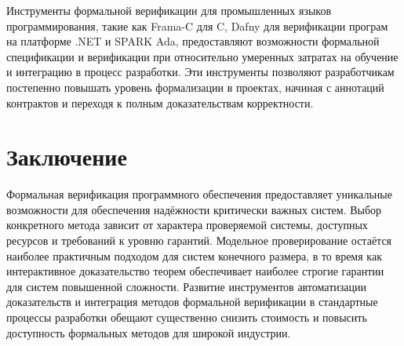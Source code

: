 \documentclass[
    language=russian,
    doctype=article,
]{../../omnilatex}
\begin{document}
Инструменты формальной верификации для промышленных языков программирования, такие как Frama-C для C, Dafny для верификации програм на платформе .NET и SPARK Ada, предоставляют возможности формальной спецификации и верификации при относительно умеренных затратах на обучение и интеграцию в процесс разработки. Эти инструменты позволяют разработчикам постепенно повышать уровень формализации в проектах, начиная с аннотаций контрактов и переходя к полным доказательствам корректности.

\section{Заключение}
Формальная верификация программного обеспечения предоставляет уникальные возможности для обеспечения надёжности критически важных систем. Выбор конкретного метода зависит от характера проверяемой системы, доступных ресурсов и требований к уровню гарантий. Модельное проверирование остаётся наиболее практичным подходом для систем конечного размера, в то время как интерактивное доказательство теорем обеспечивает наиболее строгие гарантии для систем повышенной сложности. Развитие инструментов автоматизации доказательств и интеграция методов формальной верификации в стандартные процессы разработки обещают существенно снизить стоимость и повысить доступность формальных методов для широкой индустрии.
\end{document}

